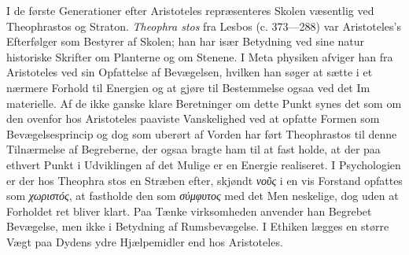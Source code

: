 \documentclass[12pt,a4paper]{book}
\newcommand{\gk}[1]{\textit{#1}}
\begin{document}
I de første Generationer efter Aristoteles repræsenteres
Skolen væsentlig ved Theophrastos og Straton. \emph{Theophra\-%
stos} fra Lesbos (c. 373---288) var Aristoteles's Efterfølger som
Bestyrer af Skolen; han har især Betydning ved sine natur\-%
historiske Skrifter om Planterne og om Stenene. I Meta\-%
physiken afviger han fra Aristoteles ved sin Opfattelse af
Bevægelsen, hvilken han søger at sætte i et nærmere Forhold
til Energien og at gjøre til Bestemmelse ogsaa ved det Im\-%
materielle. Af de ikke ganske klare Beretninger om dette
Punkt synes det som om den ovenfor hos Aristoteles paaviste
Vanskelighed ved at opfatte Formen som Bevægelsesprincip
og dog som uberørt af Vorden har ført Theophrastos til denne
Tilnærmelse af Begreberne, der ogsaa bragte ham til at fast\-%
holde, at der paa ethvert Punkt i Udviklingen af det Mulige
er en Energie realiseret. I Psychologien er der hos Theophra\-%
stos en Stræben efter, skjøndt \gk{νοῦς} i en vis Forstand opfattes
som \gk{χωριστός}, at fastholde den som \gk{σύμφυτος} med det Men\-%
neskelige, dog uden at Forholdet ret bliver klart. Paa Tænke\-%
virksomheden anvender han Begrebet Bevægelse, men ikke i
Betydning af Rumsbevægelse. I Ethiken lægges en større
Vægt paa Dydens ydre Hjælpemidler end hos Aristoteles.
\end{document}
